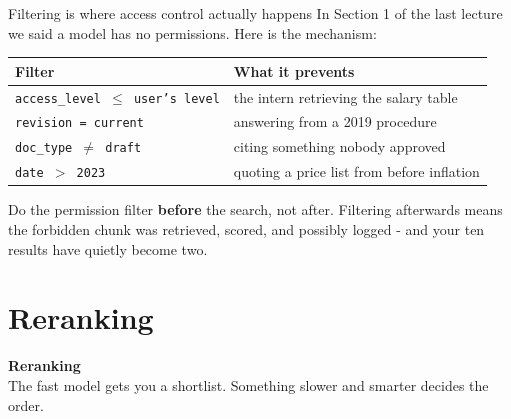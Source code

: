 \documentclass[aspectratio=169]{beamer}
\newcommand{\trapbox}[1]{%
  \begin{tcolorbox}[colback=armred!8, colframe=armred, boxrule=0.6pt, arc=2pt]
  #1
  \end{tcolorbox}}
\newcommand{\sectiontransition}[2]{%
  \begin{frame}[plain]
    \vfill
    \begin{center}
      {\Huge\bfseries\color{popblue} #1}\\[1.1em]
      {\large #2}
    \end{center}
    \vfill
  \end{frame}}
\begin{document}
\begin{frame}{Filtering is where access control actually happens}
  \vspace{0.6em}
  In Section 1 of the last lecture we said a model has no permissions. Here is the
  mechanism:

  \vspace{0.8em}
  \begin{center}
  \small
  \begin{tabular}{ll}
    \toprule
    \textbf{Filter} & \textbf{What it prevents} \\
    \midrule
    \texttt{access\_level $\leq$ user's level} & the intern retrieving the salary table \\
    \texttt{revision = current}                & answering from a 2019 procedure \\
    \texttt{doc\_type $\neq$ draft}            & citing something nobody approved \\
    \texttt{date $>$ 2023}                     & quoting a price list from before inflation \\
    \bottomrule
  \end{tabular}
  \end{center}

  \vspace{0.9em}
  \trapbox{Do the permission filter \textbf{before} the search, not after. Filtering
  afterwards means the forbidden chunk was retrieved, scored, and possibly logged - and
  your ten results have quietly become two.}
\end{frame}

\section{Reranking}
\sectiontransition{Reranking}{The fast model gets you a shortlist. Something slower and
smarter decides the order.}
\end{document}
